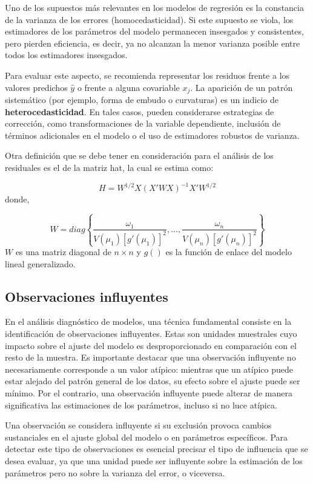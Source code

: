 \documentclass[
  12pt,
]{book}
\begin{document}
Uno de los supuestos más relevantes en los modelos de regresión es la constancia de la varianza de los errores (homocedasticidad). Si este supuesto se viola, los estimadores de los parámetros del modelo permanecen insesgados y consistentes, pero pierden eficiencia, es decir, ya no alcanzan la menor varianza posible entre todos los estimadores insesgados.

Para evaluar este aspecto, se recomienda representar los residuos frente a los valores predichos \(\hat{y}\) o frente a alguna covariable \(x_j\). La aparición de un patrón sistemático (por ejemplo, forma de embudo o curvaturas) es un indicio de \textbf{heterocedasticidad}. En tales casos, pueden considerarse estrategias de corrección, como transformaciones de la variable dependiente, inclusión de términos adicionales en el modelo o el uso de estimadores robustos de varianza.

Otra definición que se debe tener en consideración para el análisis de los residuales es el de la matriz hat, la cual se estima como:

\[
H  =  W^{1/2}X\left(X'WX\right)^{-1}X'W^{1/2}
\]
donde,

\[
W  =  diag\left\{ \frac{\omega_{1}}{V\left(\mu_{1}\right)\left[g'\left(\mu_{1}\right)\right]^{2}},...,\frac{\omega_{n}}{V\left(\mu_{n}\right)\left[g'\left(\mu_{n}\right)\right]^{2}}\right\}
\]
\(W\) es una matriz diagonal de \(n\times n\) y \(g()\) es la función de enlace del modelo lineal generalizado.

\subsection{Observaciones influyentes}\label{observaciones-influyentes}

En el análisis diagnóstico de modelos, una técnica fundamental consiste en la identificación de observaciones influyentes. Estas son unidades muestrales cuyo impacto sobre el ajuste del modelo es desproporcionado en comparación con el resto de la muestra. Es importante destacar que una observación influyente no necesariamente corresponde a un valor atípico: mientras que un atípico puede estar alejado del patrón general de los datos, su efecto sobre el ajuste puede ser mínimo. Por el contrario, una observación influyente puede alterar de manera significativa las estimaciones de los parámetros, incluso si no luce atípica.

Una observación se considera influyente si su exclusión provoca cambios sustanciales en el ajuste global del modelo o en parámetros específicos. Para detectar este tipo de observaciones es esencial precisar el tipo de influencia que se desea evaluar, ya que una unidad puede ser influyente sobre la estimación de los parámetros pero no sobre la varianza del error, o viceversa.
\end{document}
